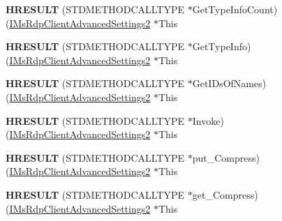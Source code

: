 \begin{DoxyCompactItemize}
{\bfseries H\+R\+E\+S\+U\+LT} (S\+T\+D\+M\+E\+T\+H\+O\+D\+C\+A\+L\+L\+T\+Y\+PE $\ast$Get\+Type\+Info\+Count)(\hyperlink{interface_m_s_t_s_c_lib_1_1_i_ms_rdp_client_advanced_settings2}{I\+Ms\+Rdp\+Client\+Advanced\+Settings2} $\ast$This
\item 
\mbox{\label{struct_m_s_t_s_c_lib_1_1_i_ms_rdp_client_advanced_settings2_vtbl_a7bae222b670d047281c539ed348daf04}} 
{\bfseries H\+R\+E\+S\+U\+LT} (S\+T\+D\+M\+E\+T\+H\+O\+D\+C\+A\+L\+L\+T\+Y\+PE $\ast$Get\+Type\+Info)(\hyperlink{interface_m_s_t_s_c_lib_1_1_i_ms_rdp_client_advanced_settings2}{I\+Ms\+Rdp\+Client\+Advanced\+Settings2} $\ast$This
\item 
\mbox{\label{struct_m_s_t_s_c_lib_1_1_i_ms_rdp_client_advanced_settings2_vtbl_a2ecfff4b861a8937aefbc24e81b4793a}} 
{\bfseries H\+R\+E\+S\+U\+LT} (S\+T\+D\+M\+E\+T\+H\+O\+D\+C\+A\+L\+L\+T\+Y\+PE $\ast$Get\+I\+Ds\+Of\+Names)(\hyperlink{interface_m_s_t_s_c_lib_1_1_i_ms_rdp_client_advanced_settings2}{I\+Ms\+Rdp\+Client\+Advanced\+Settings2} $\ast$This
\item 
\mbox{\label{struct_m_s_t_s_c_lib_1_1_i_ms_rdp_client_advanced_settings2_vtbl_aff2dd5e8426dcabdad88dc89c022cf9a}} 
{\bfseries H\+R\+E\+S\+U\+LT} (S\+T\+D\+M\+E\+T\+H\+O\+D\+C\+A\+L\+L\+T\+Y\+PE $\ast$Invoke)(\hyperlink{interface_m_s_t_s_c_lib_1_1_i_ms_rdp_client_advanced_settings2}{I\+Ms\+Rdp\+Client\+Advanced\+Settings2} $\ast$This
\item 
\mbox{\label{struct_m_s_t_s_c_lib_1_1_i_ms_rdp_client_advanced_settings2_vtbl_ac869b48db9c376189ea8f1201bba52c5}} 
{\bfseries H\+R\+E\+S\+U\+LT} (S\+T\+D\+M\+E\+T\+H\+O\+D\+C\+A\+L\+L\+T\+Y\+PE $\ast$put\+\_\+\+Compress)(\hyperlink{interface_m_s_t_s_c_lib_1_1_i_ms_rdp_client_advanced_settings2}{I\+Ms\+Rdp\+Client\+Advanced\+Settings2} $\ast$This
\item 
\mbox{\label{struct_m_s_t_s_c_lib_1_1_i_ms_rdp_client_advanced_settings2_vtbl_af024e432b0c138ef14a387a8d1dce189}} 
{\bfseries H\+R\+E\+S\+U\+LT} (S\+T\+D\+M\+E\+T\+H\+O\+D\+C\+A\+L\+L\+T\+Y\+PE $\ast$get\+\_\+\+Compress)(\hyperlink{interface_m_s_t_s_c_lib_1_1_i_ms_rdp_client_advanced_settings2}{I\+Ms\+Rdp\+Client\+Advanced\+Settings2} $\ast$This

\end{DoxyCompactItemize}
